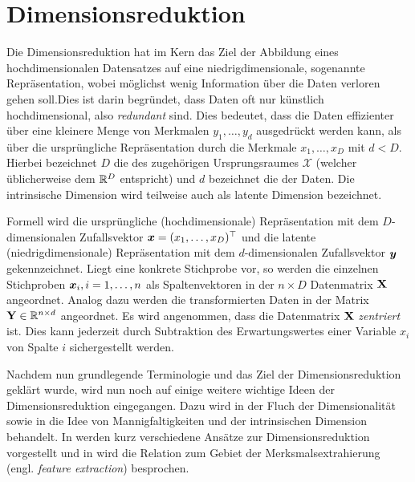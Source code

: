 \chapter{Dimensionsreduktion}
\label{ch:Dimensionsreduktion}

Die Dimensionsreduktion hat im Kern das Ziel der Abbildung eines hochdimensionalen Datensatzes auf
eine niedrigdimensionale, sogenannte  Repräsentation, wobei möglichst wenig
Information über die Daten verloren gehen soll.\addref Dies ist darin begründet, dass Daten oft nur
künstlich hochdimensional, also \textit{redundant} sind. Dies bedeutet, dass die Daten effizienter
über eine kleinere Menge von Merkmalen $y_1,\ldots,y_d$ ausgedrückt werden kann, als über die
ursprüngliche Repräsentation durch die Merkmale $x_1,\ldots,x_D$ mit $d < D$. Hierbei bezeichnet
$D$ die  des zugehörigen Ursprungsraumes $\mathcal{X}$ (welcher
üblicherweise dem $\mathbb{R}^D$ entspricht) und $d$ bezeichnet die  der
Daten. Die intrinsische Dimension wird teilweise auch als latente Dimension bezeichnet.

Formell wird die ursprüngliche (hochdimensionale) Repräsentation mit dem $D$-dimensionalen
Zufallsvektor $\bm{x} = (x_1, \ldots, x_D)^\top$ und die latente (niedrigdimensionale)
Repräsentation mit dem $d$-dimensionalen Zufallsvektor $\bm{y}$ gekennzeichnet. Liegt eine
konkrete Stichprobe vor, so werden die einzelnen Stichproben $\bm{x}_i, i = 1,\ldots,n$ als
Spaltenvektoren in der $n \times D$ Datenmatrix $\mathbf{X}$ angeordnet. Analog dazu werden die
transformierten Daten in der Matrix $\mathbf{Y} \in \mathbb{R}^{n \times d}$ angeordnet. Es wird
angenommen, dass die Datenmatrix $\mathbf{X}$ \textit{zentriert} ist. Dies kann jederzeit durch
Subtraktion des Erwartungswertes einer Variable $x_i$ von Spalte $i$ sichergestellt werden.

Nachdem nun grundlegende Terminologie und das Ziel der Dimensionsreduktion geklärt wurde, wird nun
noch auf einige weitere wichtige Ideen der Dimensionsreduktion eingegangen. Dazu wird in
 der Fluch der Dimensionalität sowie in
 die Idee von Mannigfaltigkeiten und
der intrinsischen Dimension behandelt. In  werden kurz
verschiedene Ansätze zur Dimensionsreduktion vorgestellt und in
 wird die Relation zum Gebiet der
Merksmalsextrahierung (engl. \textit{feature extraction}) besprochen.
